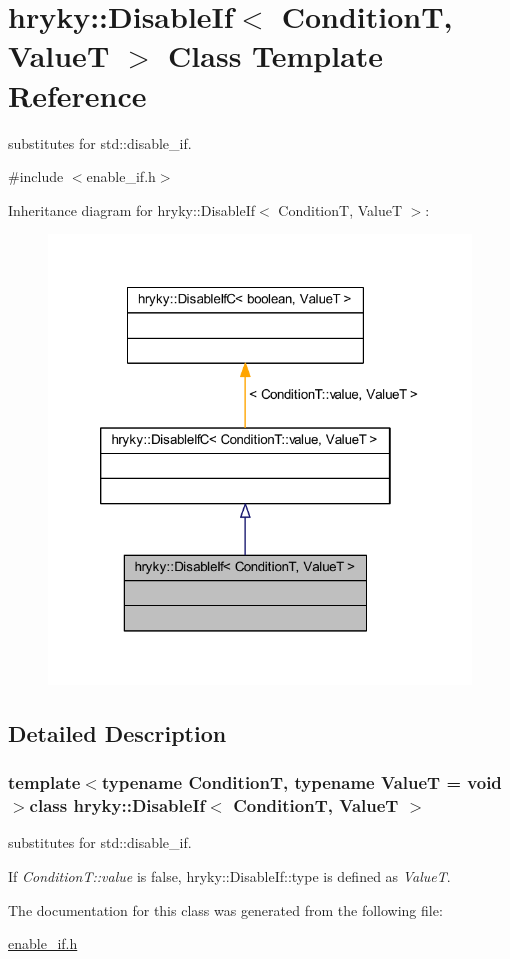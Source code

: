 \hypertarget{classhryky_1_1_disable_if}{\section{hryky\-:\-:Disable\-If$<$ Condition\-T, Value\-T $>$ Class Template Reference}
\label{classhryky_1_1_disable_if}
}


substitutes for std\-::disable\-\_\-if.  




{\ttfamily \#include $<$enable\-\_\-if.\-h$>$}



Inheritance diagram for hryky\-:\-:Disable\-If$<$ Condition\-T, Value\-T $>$\-:
\nopagebreak
\begin{figure}[H]
\begin{center}
\leavevmode
\includegraphics[width=320pt]{classhryky_1_1_disable_if__inherit__graph}
\end{center}
\end{figure}


\subsection{Detailed Description}
\subsubsection*{template$<$typename Condition\-T, typename Value\-T = void$>$class hryky\-::\-Disable\-If$<$ Condition\-T, Value\-T $>$}

substitutes for std\-::disable\-\_\-if. 

If {\itshape Condition\-T\-::value\/} is false, hryky\-::\-Disable\-If\-::type is defined as {\itshape Value\-T\/}. 

The documentation for this class was generated from the following file\-:\begin{DoxyCompactItemize}
\item 
\hyperlink{enable__if_8h}{enable\-\_\-if.\-h}\end{DoxyCompactItemize}
